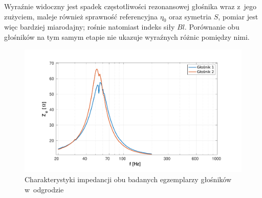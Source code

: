 \documentclass[12pt]{oska}
\begin{document}
		Wyraźnie widoczny jest spadek częstotliwości rezonansowej głośnika wraz z~jego zużyciem, maleje również sprawność referencyjna $\eta_0$ oraz symetria $S$, pomiar jest więc bardziej miarodajny; rośnie natomiast indeks siły $Bl$. Porównanie obu głośników na tym samym etapie nie ukazuje wyraźnych różnic pomiędzy nimi.
		
		\begin{figure}[!ht]
			\centering
			\includegraphics[width=.8\textwidth,trim={2cm .5cm 2cm 1cm},clip]{porownanie_glosnikow.pdf}
			\caption{Charakterystyki impedancji obu badanych egzemplarzy głośników w~odgrodzie}
			\label{r:2glosniki}
		\end{figure}
		
\end{document}
